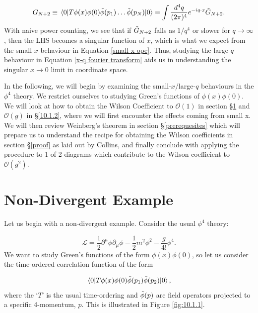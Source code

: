 \documentclass{article}
\begin{document}
 \begin{equation}
     G_{N+2} \equiv \mel{0}{T\phi(x)\phi(0)\Tilde{\phi}(p_1)\dots\Tilde{\phi}(p_N)}{0} = \int \frac{d^4q}{(2\pi)^4} e^{-iq\cdot x}\Tilde{G}_{N+2}.
     \label{x-q fourier transform}
 \end{equation}
 With naive power counting, we see that if $\Tilde{G}_{N+2}$ falls as $1/q^4$ or slower for $q\rightarrow\infty$, then the LHS becomes a singular function of $x$, which is what we expect from the small-$x$ behaviour in Equation \ref{small x ope}. Thus, studying the large $q$ behaviour in Equation \ref{x-q fourier transform} aids us in understanding the singular $x\rightarrow 0$ limit in coordinate space. 
 
 In the following, we will begin by examining the small-$x$/large-$q$ behaviours in the $\phi^4$ theory. We restrict ourselves to studying Green's functions of $\phi(x)\phi(0)$. We will look at how to obtain the Wilson Coefficient to $\mathcal{O}(1)$ in section \S\ref{10.1.1} and $\mathcal{O}(g)$ in \S\ref{10.1.2}, where we will first encounter the effects coming from small x. We will then review Weinberg's theorem in section \S\ref{prerequesites} which will prepare us to understand the recipe for obtaining the Wilson coefficients  in section \S\ref{proof} as laid out by Collins, and finally conclude with applying the procedure to 1 of 2 diagrams which contribute to the Wilson coefficient to $\mathcal{O}(g^2)$.
 
 
\section{Non-Divergent Example}\label{10.1.1}

Let us begin with a non-divergent example. Consider the usual $\phi^4$ theory:

\begin{equation}
    \mathcal{L} = \frac{1}{2}\partial^\mu\phi\partial_\mu\phi - \frac{1}{2}m^2\phi^2 - \frac{g}{4!}\phi^4.
\end{equation}
We want to study Green's functions of the form $\phi(x)\phi(0)$, so let us consider the time-ordered correlation function of the form

\begin{equation}
    \mel{0}{T\phi(x)\phi(0)\Tilde{\phi}(p_1)\Tilde{\phi}(p_2)}{0},
    \label{time ordered}
\end{equation}
where the `$T$' is the usual time-ordering and $\Tilde{\phi}(p)$ are field operators projected to a specific 4-momentum, $p$. This is illustrated in Figure \ref{fig:10.1.1}.
\end{document}
